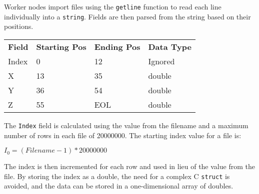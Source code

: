 Worker nodes import files using the \texttt{getline} function to read each line individually into a \texttt{string}. Fields are then parsed from the string based on their positions.

\begin{tabular}{l l l l}
\textbf{Field} & \textbf{Starting Pos} & \textbf{Ending Pos} & \textbf{Data Type} \\
Index &  0 & 12  & Ignored \\
X     & 13 & 35  & double  \\
Y     & 36 & 54  & double  \\
Z     & 55 & EOL & double \\
\end{tabular}

The \texttt{Index} field is calculated using the value from the filename and a maximum number of rows in each file of 20000000. The starting index value for a file is:

$I_0 = (Filename - 1) * 20000000$

The index is then incremented for each row and used in lieu of the value from the file. By storing the index as a double, the need for a complex C \texttt{struct} is avoided, and the data can be stored in a one-dimensional array of doubles.

